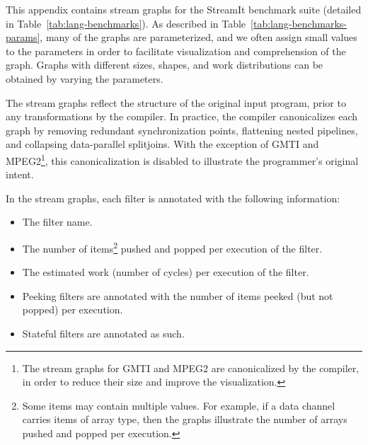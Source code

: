 \label{chap:stream-graphs}

\vspace{-\baselineskip}
This appendix contains stream graphs for the StreamIt benchmark suite
(detailed in Table~\ref{tab:lang-benchmarks}).  As described in
Table~\ref{tab:lang-benchmarks-params}, many of the graphs are
parameterized, and we often assign small values to the parameters in
order to facilitate visualization and comprehension of the graph.
Graphs with different sizes, shapes, and work distributions can be
obtained by varying the parameters.

The stream graphs reflect the structure of the original input program,
prior to any transformations by the compiler.  In practice, the
compiler canonicalizes each graph by removing redundant
synchronization points, flattening nested pipelines, and collapsing
data-parallel splitjoins.  With the exception of GMTI and
MPEG2\footnote{The stream graphs for GMTI and MPEG2 are canonicalized
by the compiler, in order to reduce their size and improve the
visualization.}, this canonicalization is disabled to illustrate the
programmer's original intent.

In the stream graphs, each filter is annotated with the following
information:
\begin{itemize}

\item The filter name.\vspace{-3pt}

\item The number of items\footnote{Some items may contain multiple
  values.  For example, if a data channel carries items of array type,
  then the graphs illustrate the number of arrays pushed and popped
  per execution.} pushed and popped per execution of the filter.\vspace{-3pt}

\item The estimated work (number of cycles) per execution of the filter.\vspace{-3pt}

\item Peeking filters are annotated with the number of items peeked (but not popped) per execution.\vspace{-3pt}

\item Stateful filters are annotated as such.

\end{itemize}

